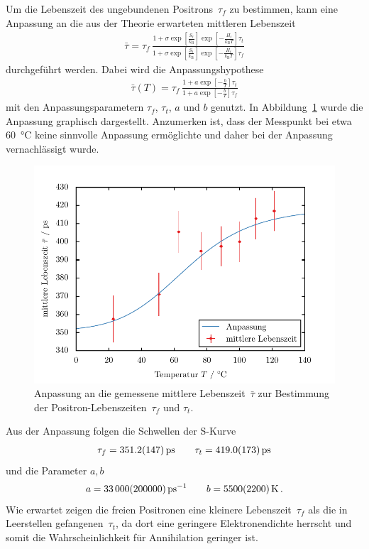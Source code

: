 \documentclass[11pt, a4paper]{article}
\numberwithin{equation}{section}
\begin{document}
Um die Lebenszeit des ungebundenen Positrons~$\tau_f$ zu bestimmen, kann eine Anpassung an die aus der Theorie erwarteten mittleren Lebenszeit 
\begin{align}
	\bar{\tau} = \tau_f \, \frac{1 + \sigma \exp\left[ \frac{S_t}{k_\mathrm{B}} \right] \exp\left[ -\frac{H_t}{k_\mathrm{B} T} \right] \tau_t}{1 + \sigma \exp\left[ \frac{S_t}{k_\mathrm{B}} \right] \exp\left[ -\frac{H_t}{k_\mathrm{B} T} \right] \tau_f}
	\label{fig:mean_lifetime}
\end{align}
durchgeführt werden.
Dabei wird die Anpassungshypothese
\begin{align*}
	\bar{\tau}(T) = \tau_f \, \frac{1 + a \exp\left[ -\frac{b}{T} \right] \tau_t}{1 + a \exp\left[ -\frac{b}{T} \right] \tau_f}
\end{align*}
mit den Anpassungsparametern $\tau_f$, $\tau_t$, $a$ und $b$ genutzt.
In Abbildung~\ref{fig:s_curve} wurde die Anpassung graphisch dargestellt.
Anzumerken ist, dass der Messpunkt bei etwa \SI{60}{\degreeCelsius} keine sinnvolle Anpassung ermöglichte und daher bei der Anpassung vernachlässigt wurde.
\begin{figure}[h]
	\centering
	\includegraphics{./figures/lifetime_s_curve.pdf}
	\caption{Anpassung an die gemessene mittlere Lebenszeit~$\bar{\tau}$ zur Bestimmung der Positron-Lebenszeiten~$\tau_f$ und $\tau_t$.}
	\label{fig:s_curve}
\end{figure}
Aus der Anpassung folgen die Schwellen der S-Kurve
\begin{align*}
	\tau_f = \SI{351.2 +- 14.7}{ps} \qquad	\tau_t = \SI{419.0 +- 17.3}{ps}
\end{align*}
und die Parameter $a, b$
\begin{align*}
	a = \SI{33000 +- 200000}{\per\pico\second} \qquad b = \SI{5500 +- 2200}{\kelvin} \, \text{.}
\end{align*}
Wie erwartet zeigen die freien Positronen eine kleinere Lebenszeit~$\tau_f$ als die in Leerstellen gefangenen~$\tau_t$, da dort eine geringere Elektronendichte herrscht und somit die Wahrscheinlichkeit für Annihilation geringer ist.
\end{document}
